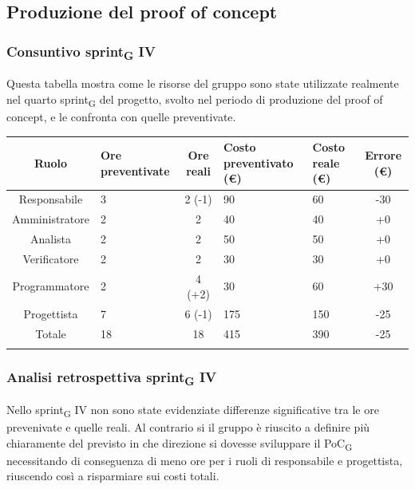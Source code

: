 \subsection{Produzione del proof of concept}
%
\subsubsection{Consuntivo sprint\textsubscript{G} IV}

Questa tabella mostra come le risorse del gruppo sono state utilizzate realmente nel quarto sprint\textsubscript{G} del progetto, svolto nel periodo di produzione del proof of concept, e le confronta con quelle preventivate.

\setlength\extrarowheight{5pt}
\begin{tabularx}{\textwidth}{|c|XcXX|c|}
	\hline
	\rowcolor{white}
	\textbf{Ruolo} & \textbf{Ore preventivate} & \textbf{Ore reali} & \textbf{Costo preventivato (€)} & \textbf{Costo reale (€)} & \textbf{Errore (€)} \\
	\hline
	Responsabile &3&2 (-1)&90&60&-30\\
	Amministratore &2&2 &40&40&+0\\
	Analista &2&2&50&50&+0\\
	Verificatore &2&2&30&30&+0\\
	Programmatore &2&4 (+2)&30&60&+30\\
	Progettista &7&6 (-1)&175&150&-25 \\
	\hline
	Totale &18&18&415&390&-25\\
	\hline
	\rowcolor{white}
	\caption{Consuntivo ore e costi per ruolo del quarto sprint\textsubscript{G}}
\end{tabularx}
\subsubsection{Analisi retrospettiva sprint\textsubscript{G} IV}
Nello sprint\textsubscript{G} IV non sono state evidenziate differenze significative tra le ore prevenivate e quelle reali. Al contrario si il gruppo è riuscito a definire più chiaramente del previsto in che direzione si dovesse sviluppare il PoC\textsubscript{G} necessitando di conseguenza di meno ore per i ruoli di responsabile e progettista, riuscendo così a risparmiare sui costi totali.

